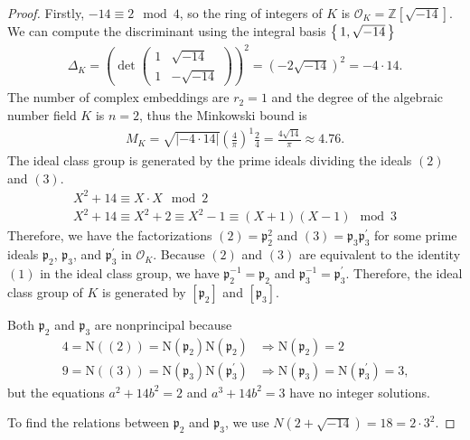 \begin{proof}
    Firstly, \(-14 \equiv 2 \mod{4}\), so the ring of integers of \(K\) is \(\mathcal{O}_K = \mathbb{Z}[\sqrt{-14}]\). We can compute the discriminant using the integral basis \(\left\{\, 1, \sqrt{-14} \,\right\}\)
    \begin{align*}
        \Delta_K = \left(\det \begin{pmatrix}
            1 & \sqrt{-14} \\
            1 & -\sqrt{-14}
        \end{pmatrix}\right)^2
        = \left(-2 \sqrt{-14}\right)^2
        = -4 \cdot 14 \text{.}
    \end{align*}
    The number of complex embeddings are \(r_2 = 1\) and the degree of the algebraic number field \(K\) is \(n = 2\), thus the Minkowski bound is
    \begin{align*}
        M_K = \sqrt{|-4 \cdot 14|} \left(\frac{4}{\pi}\right)^1 \frac{2}{4}
        = \frac{4\sqrt{14}}{\pi}
        \approx 4.76 \text{.}
    \end{align*}
    The ideal class group is generated by the prime ideals dividing the ideals \((2)\) and \((3)\).
    \begin{align*}
        X^2 + 14 \equiv X \cdot X \mod{2} \\
        X^2 + 14 \equiv X^2 + 2 \equiv X^2 - 1 \equiv (X + 1) (X - 1) \mod{3}
    \end{align*}
    Therefore, we have the factorizations \((2) = \mathfrak{p}_2^2\) and \((3) = \mathfrak{p}_3 \mathfrak{p}_3^\prime\) for some prime ideals \(\mathfrak{p}_2\), \(\mathfrak{p}_3\), and \(\mathfrak{p}_3^\prime\) in \(\mathcal{O}_K\). Because \((2)\) and \((3)\) are equivalent to the identity \((1)\) in the ideal class group, we have \(\mathfrak{p}_2^{-1} = \mathfrak{p}_2\) and \(\mathfrak{p}_3^{-1} = \mathfrak{p}_3^\prime\). Therefore, the ideal class group of \(K\) is generated by \([\mathfrak{p}_2]\) and \([\mathfrak{p}_3]\).

    Both \(\mathfrak{p}_2\) and \(\mathfrak{p}_3\) are nonprincipal because
    \begin{align*}
        4 = \mathrm{N}((2)) = \mathrm{N}(\mathfrak{p}_2) \mathrm{N}(\mathfrak{p}_2) &\Rightarrow \mathrm{N}(\mathfrak{p}_2) = 2 \\
        9 = \mathrm{N}((3)) = \mathrm{N}(\mathfrak{p}_3) \mathrm{N}(\mathfrak{p}_3^\prime) &\Rightarrow \mathrm{N}(\mathfrak{p}_3) = \mathrm{N}(\mathfrak{p}_3^\prime) = 3 \text{,}
    \end{align*}
    but the equations \(a^2 + 14 b^2 = 2\) and \(a^3 + 14 b^2 = 3\) have no integer solutions.

    To find the relations between \(\mathfrak{p}_2\) and \(\mathfrak{p}_3\), we use \(N(2 + \sqrt{-14}) = 18 = 2 \cdot 3^2\).
\end{proof}